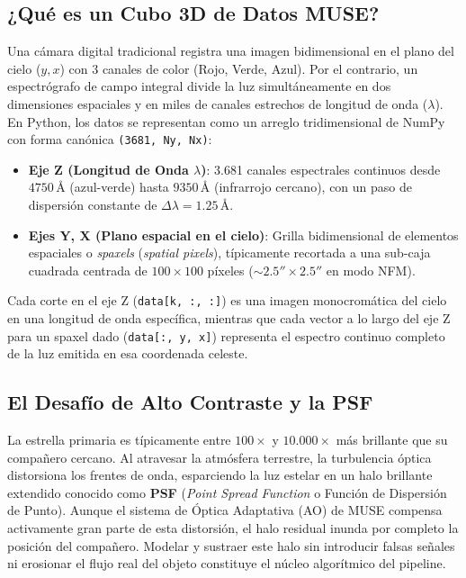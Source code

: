 \documentclass[11pt,a4paper]{article}
\begin{document}
\subsection{¿Qué es un Cubo 3D de Datos MUSE?}
Una cámara digital tradicional registra una imagen bidimensional en el plano del cielo ($y, x$) con 3 canales de color (Rojo, Verde, Azul). Por el contrario, un espectrógrafo de campo integral divide la luz simultáneamente en dos dimensiones espaciales y en miles de canales estrechos de longitud de onda ($\lambda$). En Python, los datos se representan como un arreglo tridimensional de NumPy con forma canónica \texttt{(3681, Ny, Nx)}:
\begin{itemize}[leftmargin=1.2cm]
    \item \textbf{Eje Z (Longitud de Onda $\lambda$)}: 3.681 canales espectrales continuos desde $4750\,\text{\AA}$ (azul-verde) hasta $9350\,\text{\AA}$ (infrarrojo cercano), con un paso de dispersión constante de $\Delta\lambda = 1.25\,\text{\AA}$.
    \item \textbf{Ejes Y, X (Plano espacial en el cielo)}: Grilla bidimensional de elementos espaciales o \textit{spaxels} (\textit{spatial pixels}), típicamente recortada a una sub-caja cuadrada centrada de $100 \times 100$ píxeles ($\sim 2.5'' \times 2.5''$ en modo NFM).
\end{itemize}
Cada corte en el eje Z (\texttt{data[k, :, :]}) es una imagen monocromática del cielo en una longitud de onda específica, mientras que cada vector a lo largo del eje Z para un spaxel dado (\texttt{data[:, y, x]}) representa el espectro continuo completo de la luz emitida en esa coordenada celeste.

\subsection{El Desafío de Alto Contraste y la PSF}
La estrella primaria es típicamente entre $100\times$ y $10.000\times$ más brillante que su compañero cercano. Al atravesar la atmósfera terrestre, la turbulencia óptica distorsiona los frentes de onda, esparciendo la luz estelar en un halo brillante extendido conocido como \textbf{PSF} (\textit{Point Spread Function} o Función de Dispersión de Punto). Aunque el sistema de Óptica Adaptativa (AO) de MUSE compensa activamente gran parte de esta distorsión, el halo residual inunda por completo la posición del compañero. Modelar y sustraer este halo sin introducir falsas señales ni erosionar el flujo real del objeto constituye el núcleo algorítmico del pipeline.
\end{document}

